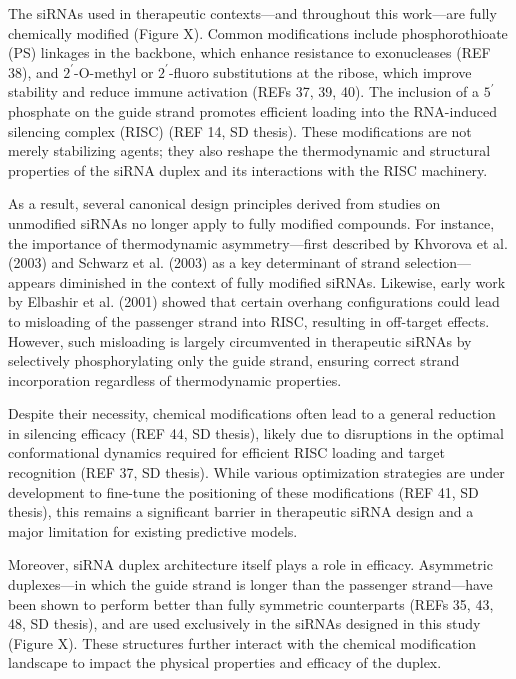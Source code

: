 \documentclass{report}
\begin{document}
The siRNAs used in therapeutic contexts—and throughout this work—are fully chemically modified (Figure X). Common modifications include phosphorothioate (PS) linkages in the backbone, which enhance resistance to exonucleases (REF 38), and $2^\prime$-O-methyl or $2^\prime$-fluoro substitutions at the ribose, which improve stability and reduce immune activation (REFs 37, 39, 40). The inclusion of a $5^\prime$ phosphate on the guide strand promotes efficient loading into the RNA-induced silencing complex (RISC) (REF 14, SD thesis). These modifications are not merely stabilizing agents; they also reshape the thermodynamic and structural properties of the siRNA duplex and its interactions with the RISC machinery.

As a result, several canonical design principles derived from studies on unmodified siRNAs no longer apply to fully modified compounds. For instance, the importance of thermodynamic asymmetry—first described by Khvorova et al. (2003) and Schwarz et al. (2003) as a key determinant of strand selection—appears diminished in the context of fully modified siRNAs. Likewise, early work by Elbashir et al. (2001) showed that certain overhang configurations could lead to misloading of the passenger strand into RISC, resulting in off-target effects. However, such misloading is largely circumvented in therapeutic siRNAs by selectively phosphorylating only the guide strand, ensuring correct strand incorporation regardless of thermodynamic properties.

Despite their necessity, chemical modifications often lead to a general reduction in silencing efficacy (REF 44, SD thesis), likely due to disruptions in the optimal conformational dynamics required for efficient RISC loading and target recognition (REF 37, SD thesis). While various optimization strategies are under development to fine-tune the positioning of these modifications (REF 41, SD thesis), this remains a significant barrier in therapeutic siRNA design and a major limitation for existing predictive models.

Moreover, siRNA duplex architecture itself plays a role in efficacy. Asymmetric duplexes—in which the guide strand is longer than the passenger strand—have been shown to perform better than fully symmetric counterparts (REFs 35, 43, 48, SD thesis), and are used exclusively in the siRNAs designed in this study (Figure X). These structures further interact with the chemical modification landscape to impact the physical properties and efficacy of the duplex.
\end{document}
